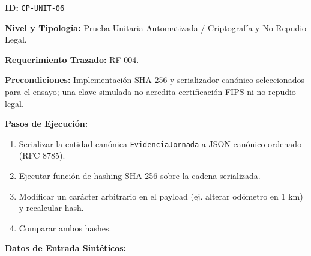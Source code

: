 \par\noindent\textbf{ID:} \texttt{C\allowbreak{}P\allowbreak{}-\allowbreak{}U\allowbreak{}N\allowbreak{}I\allowbreak{}T\allowbreak{}-\allowbreak{}0\allowbreak{}6\allowbreak{}}\par
\par\noindent\textbf{Nivel y Tipología:} Prueba Unitaria Automatizada / Criptografía y No Repudio Legal.\par
\par\noindent\textbf{Requerimiento Trazado:} RF-004.\par
\par\noindent\textbf{Precondiciones:} Implementación SHA-256 y serializador canónico seleccionados para el ensayo; una clave simulada no acredita certificación FIPS ni no repudio legal.\par
\par\noindent\textbf{Pasos de Ejecución:} \par
\begin{enumerate}
\item Serializar la entidad canónica \texttt{E\allowbreak{}v\allowbreak{}i\allowbreak{}d\allowbreak{}e\allowbreak{}n\allowbreak{}c\allowbreak{}i\allowbreak{}a\allowbreak{}J\allowbreak{}o\allowbreak{}r\allowbreak{}n\allowbreak{}a\allowbreak{}d\allowbreak{}a\allowbreak{}} a JSON canónico ordenado (RFC 8785).
\item Ejecutar función de hashing SHA-256 sobre la cadena serializada.
\item Modificar un carácter arbitrario en el payload (ej. alterar odómetro en 1 km) y recalcular hash.
\item Comparar ambos hashes.
\end{enumerate}
\par\noindent\textbf{Datos de Entrada Sintéticos:} \par
